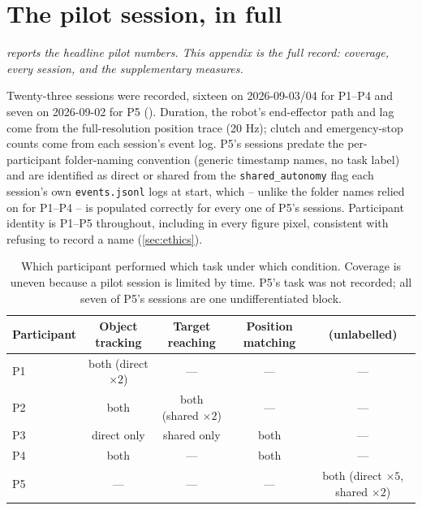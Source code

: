 \chapter{The pilot session, in full}
\label{app:pilot}

\noindent\emph{ reports the headline pilot numbers.
This appendix is the full record: coverage, every session, and the
supplementary measures.}

Twenty-three sessions were recorded, sixteen on 2026-09-03/04 for P1--P4 and
seven on 2026-09-02 for P5 (). Duration, the
robot's end-effector path and lag come from the full-resolution position trace
(20 Hz); clutch and emergency-stop counts come from each session's event
log. P5's sessions predate the per-participant folder-naming convention
(generic timestamp names, no task label) and are identified as direct or
shared from the \texttt{shared\_autonomy} flag each session's own
\texttt{events.jsonl} logs at start, which -- unlike the folder names relied
on for P1--P4 -- is populated correctly for every one of P5's sessions.
Participant identity is P1--P5 throughout, including in every figure pixel,
consistent with  refusing to record a name
(\cref{sec:ethics}).

\begin{table}[htbp]
  \centering
  \small
  \caption[Pilot coverage]{Which participant performed which task under which
  condition. Coverage is uneven because a pilot session is limited by time.
  P5's task was not recorded; all seven of P5's sessions are one
  undifferentiated block.}
  \label{tab:pilot-coverage}
  \begin{tabular}{@{}lcccc@{}}
    \toprule
    Participant & Object tracking & Target reaching & Position matching & (unlabelled) \\
    \midrule
    P1 & both (direct $\times2$) & --- & --- & --- \\
    P2 & both & both (shared $\times2$) & --- & --- \\
    P3 & direct only & shared only & both & --- \\
    P4 & both & --- & both & --- \\
    P5 & --- & --- & --- & both (direct $\times5$, shared $\times2$) \\
    \bottomrule
  \end{tabular}
\end{table}

